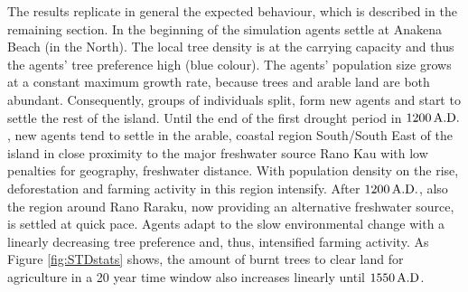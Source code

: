 The results replicate in general the expected behaviour, which is described in the remaining section. 
In the beginning of the simulation agents settle at Anakena Beach (in the North). 
The local tree density is at the carrying capacity and thus the agents' tree preference high (blue colour).
The agents' population size grows at a constant maximum growth rate, because trees and arable land are both abundant. 
Consequently, groups of individuals split, form new agents and start to settle the rest of the island.
Until the end of the first drought period in $1200\, {\rm A.D.}$, new agents tend to settle in the arable, coastal region South/South East of the island in close proximity to the major freshwater source Rano Kau with low penalties for geography, freshwater distance. 
With population density on the rise, deforestation and farming activity in this region intensify.
After $1200\, {\rm A.D.}$, also the region around Rano Raraku, now providing an alternative freshwater source, is settled at quick pace.
Agents adapt to the slow environmental change with a linearly decreasing tree preference and, thus, intensified farming activity.
As Figure \ref{fig:STDstats} shows, the amount of burnt trees to clear land for agriculture in a 20 year time window also increases linearly until $1550\, {\rm A.D}$.

